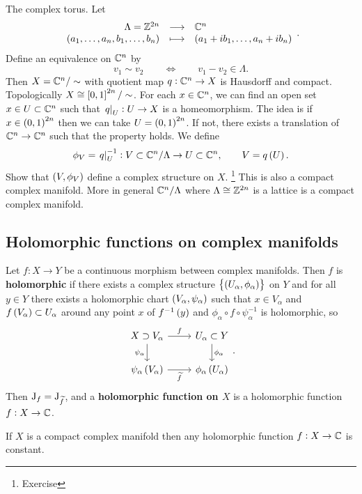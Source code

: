 \begin{example}
The complex torus. Let
$$ \function{\Lambda = \ZZ^{2n}}{\CC^n}{\br{a_1, \dots, a_n, b_1, \dots, b_n}}{\br{a_1 + ib_1, \dots, a_n + ib_n}}. $$
Define an equivalence on $ \mathbb{C}^n $ by
$$ v_1 \sim v_2 \qquad \iff \qquad v_1 - v_2 \in \Lambda. $$
Then $ X = \mathbb{C}^n / \sim $ with quotient map $ q : \mathbb{C}^n \to X $ is Hausdorff and compact. Topologically $ X \cong \sbr{0, 1}^{2n} / \sim $. For each $ x \in \mathbb{C}^n $, we can find an open set $ x \in U \subset \mathbb{C}^n $ such that $ \left. q \right|_U : U \to X $ is a homeomorphism. The idea is if $ x \in \br{0, 1}^{2n} $ then we can take $ U = \br{0, 1}^{2n} $. If not, there exists a translation of $ \mathbb{C}^n \to \mathbb{C}^n $ such that the property holds. We define
$$ \phi_V = \eval{q}_U^{-1} : V \subset \CC^n / \Lambda \to U \subset \CC^n, \qquad V = q\br{U}. $$
Show that $ \br{V, \phi_V} $ define a complex structure on $ X $. \footnote{Exercise} This is also a compact complex manifold. More in general $ \mathbb{C}^n / \Lambda $ where $ \Lambda \cong \mathbb{Z}^{2n} $ is a lattice is a compact complex manifold.
\end{example}

\subsection{Holomorphic functions on complex manifolds}


\begin{definition}
Let $ f : X \to Y $ be a continuous morphism between complex manifolds. Then $ f $ is \textbf{holomorphic} if there exists a complex structure $ \cbr{\br{U_\alpha, \phi_\alpha}} $ on $ Y $ and for all $ y \in Y $ there exists a holomorphic chart $ \br{V_\alpha, \psi_\alpha} $ such that $ x \in V_\alpha $ and $ f\br{V_\alpha} \subset U_\alpha $ around any point $ x $ of $ f^{-1}\br{y} $ and $ \phi_\alpha \circ f \circ \psi_\alpha^{-1} $ is holomorphic, so
$$
\begin{tikzcd}
X \supset V_\alpha \arrow{r}{f} \arrow[swap]{d}{\psi_\alpha} & U_\alpha \subset Y \arrow{d}{\phi_\alpha} \\
\psi_\alpha\br{V_\alpha} \arrow[swap]{r}{\widetilde{f}} & \phi_\alpha\br{U_\alpha}
\end{tikzcd}.
$$
Then $ \mathrm{J}_f = \mathrm{J}_{\widetilde{f}} $, and a \textbf{holomorphic function on $ X $} is a holomorphic function $ f : X \to \mathbb{C} $.
\end{definition}

\begin{exercise}
If $ X $ is a compact complex manifold then any holomorphic function $ f : X \to \mathbb{C} $ is constant.
\end{exercise}

